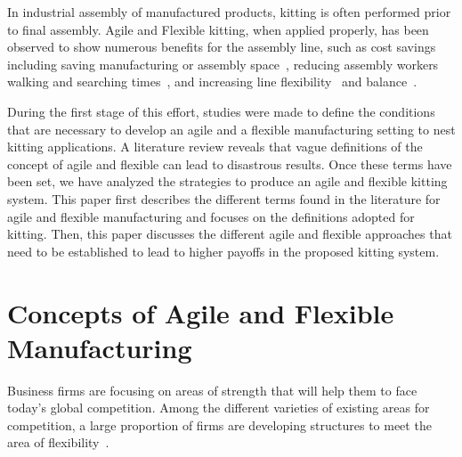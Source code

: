 \documentclass[final,12pt]{elsarticle}
\begin{document}
In industrial assembly of manufactured products, kitting is often performed prior to final assembly. Agile and Flexible kitting, when applied properly, has been observed to show numerous benefits for the assembly line, such as cost savings~\cite{Carlsson_2008} including saving manufacturing or assembly space~\cite{Medbo2003}, reducing assembly workers walking and searching times~\cite{Schwind1992}, and increasing line flexibility~\cite{Bozer1992} and balance~\cite{Jiao2000}.
%

During the first stage of this effort, studies were made to define the conditions that are necessary to develop an agile and a flexible manufacturing setting to nest kitting applications. A literature review reveals that vague definitions of the concept of agile and flexible can lead to disastrous results. Once these terms have been set, we have analyzed the strategies to produce an agile and flexible kitting system. This paper first describes the different terms found in the literature for agile and flexible manufacturing and focuses on the definitions adopted for kitting. Then, this paper discusses the different agile and flexible approaches that need to be established to lead to higher payoffs in the proposed kitting system.


\section{Concepts of Agile and Flexible Manufacturing}
\label{Sect:AgilityFlexibility}

Business firms are focusing on areas of strength that will help them to face today's global competition. Among the different varieties of existing areas for competition, a large proportion of firms are developing structures to meet the area of flexibility~\cite{Jaikumar.HBR.1986,Dertouzos.MIT.1990}.
\end{document}
